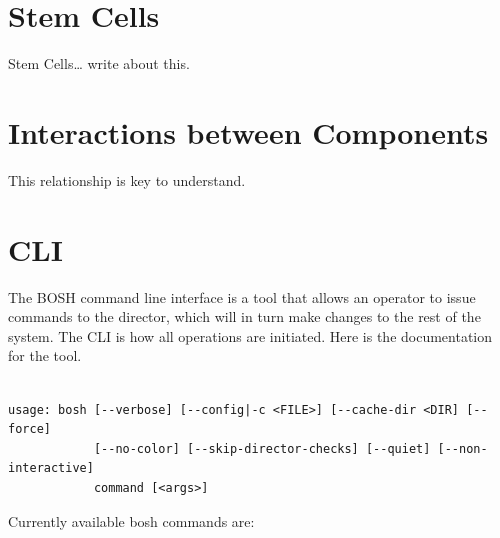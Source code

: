 \chapter{Stem Cells}
\label{stemcells}

Stem Cells{\ldots} write about this.

\chapter{Interactions between Components}
\label{interactionsbetweencomponents}

This relationship is key to understand.

\chapter{CLI}
\label{cli}

The BOSH command line interface is a tool that allows an operator to issue commands to the director, which will in turn make changes to the rest of the system. The CLI is how all operations are initiated. Here is the documentation for the tool.

\begin{adjustwidth}{2.5em}{2.5em}
\begin{verbatim}

usage: bosh [--verbose] [--config|-c <FILE>] [--cache-dir <DIR] [--force]
            [--no-color] [--skip-director-checks] [--quiet] [--non-interactive]
            command [<args>]

\end{verbatim}
\end{adjustwidth}

Currently available bosh commands are:

